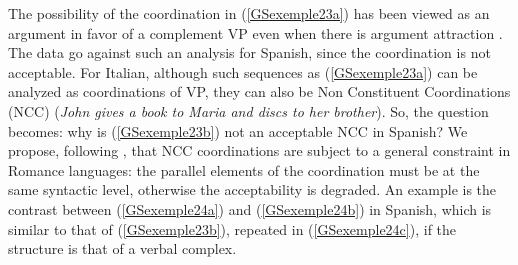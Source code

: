 \documentclass[output=paper
                ,modfonts
                ,nonflat
	        ,collection
	        ,collectionchapter
	        ,collectiontoclongg
 	        ,biblatex
                ,babelshorthands
                ,newtxmath
                ,draftmode
                ,colorlinks, citecolor=brown
]{./langsci/langscibook}
\begin{document}
{The possibility of the coordination in (\ref{GSexemple23a}) has been viewed as an argument in favor of a complement VP even when there is argument attraction \citep{andrews1999complex}. The data go against such an analysis for Spanish, since the coordination is not acceptable. For Italian, although such sequences as (\ref{GSexemple23a}) can be analyzed as coordinations of VP, they can also be Non Constituent Coordinations (NCC) (\emph{John gives a book to Maria and discs to her brother}). So, the question becomes: why is (\ref{GSexemple23b}) not an acceptable NCC in Spanish? We propose, following \citep{AG2010}, that NCC coordinations are subject to a general constraint in Romance languages: the parallel elements of the coordination must be at the same syntactic level, otherwise the acceptability is degraded. An example is the contrast between (\ref{GSexemple24a}) and (\ref{GSexemple24b}) in Spanish, which is similar to that of (\ref{GSexemple23b}), repeated in (\ref{GSexemple24c}), if the structure is that of a verbal complex.

\eal
	\label{GSexemple24} 
	\label{GSexemple24a}
	
	\label{GSexemple24b}
	
	\label{GSexemple24c}
\zl

}
\end{document}
